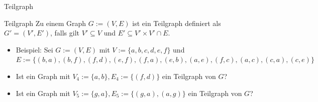 \documentclass[handout]{beamer}
\begin{document}
\begin{frame}{Teilgraph}
	\begin{block}{Teilgraph}
		Zu einem Graph $G := (V, E)$ ist ein Teilgraph definiert als $G' = (V', E')$, falls gilt $V' \subseteq V$ und $E' \subseteq V' \times V' \cap E$.
	\end{block}
	
	\begin{itemize}
		\item Beispiel: Sei $G := (V,E)$ mit $V := \{a,b,c,d,e,f\}$ und $E := \{(b,a),(b,f),(f,d),(e,f),(f,a),(e,b),(a,e),(f,c),(a,c),(c,a),(c,e)\}$
		\p\item Ist ein Graph mit $V_4:=\{a,b\}, E_4:= \{(f,d)\}$ ein Teilgraph von $G$?
		\p\item Ist ein Graph mit $V_5:=\{g,a\}, E_5:=\{(g,a),(a,g)\}$ ein Teilgraph von $G$?
	\end{itemize}
\end{frame}
\end{document}
